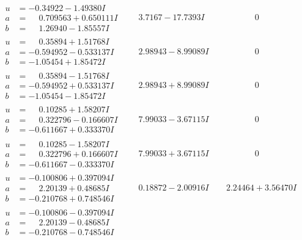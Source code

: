 \documentclass[1p]{elsarticle_modified}
\theoremstyle{definition}
\begin{document}
$$\begin{array}{c|c|c}
\begin{aligned}
u &= -0.34922 - 1.49380 I \\
a &= \phantom{-}0.709563 + 0.650111 I \\
b &= \phantom{-}1.26940 - 1.85557 I\end{aligned}
 & \phantom{-}3.7167 - 17.7393 I & \phantom{-0.000000 } 0 \\ \hline\begin{aligned}
u &= \phantom{-}0.35894 + 1.51768 I \\
a &= -0.594952 - 0.533137 I \\
b &= -1.05454 + 1.85472 I\end{aligned}
 & \phantom{-}2.98943 - 8.99089 I & \phantom{-0.000000 } 0 \\ \hline\begin{aligned}
u &= \phantom{-}0.35894 - 1.51768 I \\
a &= -0.594952 + 0.533137 I \\
b &= -1.05454 - 1.85472 I\end{aligned}
 & \phantom{-}2.98943 + 8.99089 I & \phantom{-0.000000 } 0 \\ \hline\begin{aligned}
u &= \phantom{-}0.10285 + 1.58207 I \\
a &= \phantom{-}0.322796 - 0.166607 I \\
b &= -0.611667 + 0.333370 I\end{aligned}
 & \phantom{-}7.99033 - 3.67115 I & \phantom{-0.000000 } 0 \\ \hline\begin{aligned}
u &= \phantom{-}0.10285 - 1.58207 I \\
a &= \phantom{-}0.322796 + 0.166607 I \\
b &= -0.611667 - 0.333370 I\end{aligned}
 & \phantom{-}7.99033 + 3.67115 I & \phantom{-0.000000 } 0 \\ \hline\begin{aligned}
u &= -0.100806 + 0.397094 I \\
a &= \phantom{-}2.20139 + 0.48685 I \\
b &= -0.210768 + 0.748546 I\end{aligned}
 & \phantom{-}0.18872 - 2.00916 I & \phantom{-}2.24464 + 3.56470 I \\ \hline\begin{aligned}
u &= -0.100806 - 0.397094 I \\
a &= \phantom{-}2.20139 - 0.48685 I \\
b &= -0.210768 - 0.748546 I\end{aligned}

\end{array}$$
\end{document}
